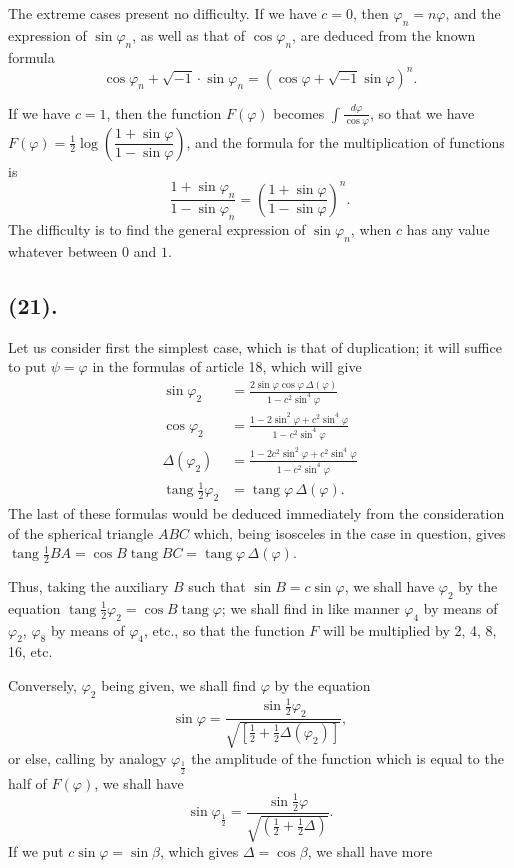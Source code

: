 \documentclass{article}
\begin{document}
The extreme cases present no difficulty. If we have $c=0$, then $\varphi_{n}=n\varphi$, and the expression of $\sin\varphi_{n}$, as well as that of $\cos\varphi_{n}$, are deduced from the known formula
\[ \cos\varphi_{n}+\sqrt{-1}\cdot\sin\varphi_{n}=(\cos\varphi+\sqrt{-1}\sin\varphi)^{n}. \]

If we have $c=1$, then the function $F(\varphi)$ becomes $\displaystyle\int\frac{d\varphi}{\cos\varphi}$, so that we have $F(\varphi)=\frac{1}{2}\log\left(\dfrac{1+\sin\varphi}{1-\sin\varphi}\right)$, and the formula for the multiplication of functions is
\[ \frac{1+\sin\varphi_{n}}{1-\sin\varphi_{n}}=\left(\frac{1+\sin\varphi}{1-\sin\varphi}\right)^{n}. \]
The difficulty is to find the general expression of $\sin\varphi_{n}$, when $c$ has any value whatever between $0$ and $1$.

\subsection*{(21).}

Let us consider first the simplest case, which is that of duplication; it will suffice to put $\psi=\varphi$ in the formulas of article 18, which will give
\[ \begin{aligned} \sin\varphi_{2} &= \frac{2\sin\varphi\cos\varphi\,\Delta(\varphi)}{1-c^{2}\sin^{4}\varphi} \\ \cos\varphi_{2} &= \frac{1-2\sin^{2}\varphi+c^{2}\sin^{4}\varphi}{1-c^{2}\sin^{4}\varphi} \\ \Delta(\varphi_{2}) &= \frac{1-2c^{2}\sin^{2}\varphi+c^{2}\sin^{4}\varphi}{1-c^{2}\sin^{4}\varphi} \\ \operatorname{tang}\tfrac{1}{2}\varphi_{2} &= \operatorname{tang}\varphi\,\Delta(\varphi). \end{aligned} \]
The last of these formulas would be deduced immediately from the consideration of the spherical triangle $ABC$ which, being isosceles in the case in question, gives $\operatorname{tang}\frac{1}{2}BA=\cos B\operatorname{tang}BC=\operatorname{tang}\varphi\,\Delta(\varphi)$.

Thus, taking the auxiliary $B$ such that $\sin B=c\sin\varphi$, we shall have $\varphi_{2}$ by the equation $\operatorname{tang}\frac{1}{2}\varphi_{2}=\cos B\operatorname{tang}\varphi$; we shall find in like manner $\varphi_{4}$ by means of $\varphi_{2}$, $\varphi_{8}$ by means of $\varphi_{4}$, etc., so that the function $F$ will be multiplied by 2, 4, 8, 16, etc.

Conversely, $\varphi_{2}$ being given, we shall find $\varphi$ by the equation
\[ \sin\varphi=\frac{\sin\frac{1}{2}\varphi_{2}}{\sqrt{[\frac{1}{2}+\frac{1}{2}\Delta(\varphi_{2})]}}, \]
or else, calling by analogy $\varphi_{\frac{1}{2}}$ the amplitude of the function which is equal to the half of $F(\varphi)$, we shall have
\[ \sin\varphi_{\frac{1}{2}}=\frac{\sin\frac{1}{2}\varphi}{\sqrt{(\frac{1}{2}+\frac{1}{2}\Delta)}}. \]
If we put $c\sin\varphi=\sin\beta$, which gives $\Delta=\cos\beta$, we shall have more
\end{document}

